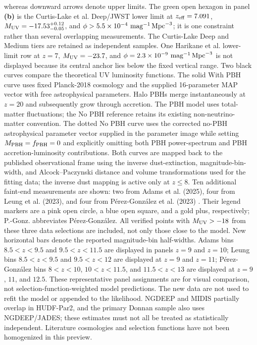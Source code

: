 {whereas downward arrows denote upper limits.
The green open hexagon in panel \textbf{(b)} is the Curtis-Lake et al.
Deep/JWST lower limit at $z_{\rm eff}=7.091$,
$M_{\rm UV}=-17.53^{+0.12}_{-0.05}$, and
$\phi>5.5\times10^{-4}\ {\rm mag}^{-1}\,{\rm Mpc}^{-3}$; it is one
constraint rather than several overlapping measurements.
The Curtis-Lake Deep and Medium tiers are retained as independent
samples. One Harikane et al. lower-limit row at $z=7$,
$M_{\rm UV}=-23.7$, and $\phi=2.3\times10^{-9}\
{\rm mag}^{-1}\,{\rm Mpc}^{-3}$ is not displayed because its central
anchor lies below the fixed vertical range. Two black curves compare the theoretical UV luminosity functions. The solid With PBH curve uses fixed Planck-2018 cosmology and the supplied 16-parameter MAP vector with free astrophysical parameters. Halo PBHs merge instantaneously at $z=20$ and subsequently grow through accretion. The PBH model uses total-matter fluctuations; the No PBH reference retains its existing non-neutrino-matter convention. The dotted No PBH curve uses the corrected no-PBH astrophysical parameter vector supplied in the parameter image while setting $M_{\rm PBH}=f_{\rm PBH}=0$ and explicitly omitting both PBH power-spectrum and PBH accretion-luminosity contributions. Both curves are mapped back to the published observational frame using the inverse dust-extinction, magnitude-bin-width, and Alcock--Paczynski distance and volume transformations used for the fitting data; the inverse dust mapping is active only at $z\leq8$. Ten additional faint-end measurements are shown: two from Adams et al. (2025),
four from Leung et al. (2023), and four from Pérez-González et al. (2023)
\citep{Adams2025MediumBands,Leung2023NGDEEP,PerezGonzalez2023MIDIS}.
Their legend markers are a pink open circle, a blue open square, and a gold plus,
respectively; P.-Gonz. abbreviates Pérez-González.
All verified points with $M_{\rm UV}>-18$ from these three data selections are included,
not only those close to the model. New horizontal bars denote the reported magnitude-bin half-widths.
Adams bins $8.5<z<9.5$ and $9.5<z<11.5$ are displayed in panels $z=9$ and $z=10$;
Leung bins $8.5<z<9.5$ and $9.5<z<12$ are displayed at $z=9$ and $z=11$;
Pérez-González bins $8<z<10$, $10<z<11.5$, and $11.5<z<13$ are displayed at $z=9$, $11$, and $12.5$.
These representative panel assignments are for visual comparison, not selection-function-weighted model predictions.
The new data are not used to refit the model or appended to the likelihood.
NGDEEP and MIDIS partially overlap in HUDF-Par2, and the primary Donnan sample also uses NGDEEP/JADES;
these estimates must not all be treated as statistically independent.
Literature cosmologies and selection functions have not been homogenized in this preview.}
